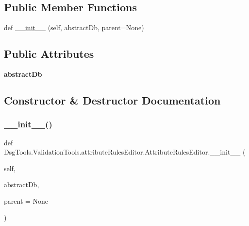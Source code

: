 \subsection*{Public Member Functions}
\begin{DoxyCompactItemize}
\item 
def \mbox{\hyperlink{class_dsg_tools_1_1_validation_tools_1_1attribute_rules_editor_1_1_attribute_rules_editor_a6d02f1461b839b8b83d65214df579569}{\+\_\+\+\_\+init\+\_\+\+\_\+}} (self, abstract\+Db, parent=None)
\end{DoxyCompactItemize}
\subsection*{Public Attributes}
\begin{DoxyCompactItemize}
\item 
\mbox{\label{class_dsg_tools_1_1_validation_tools_1_1attribute_rules_editor_1_1_attribute_rules_editor_a4102cf2d5f1e05633e457c342df95482}} 
{\bfseries abstract\+Db}
\end{DoxyCompactItemize}


\subsection{Constructor \& Destructor Documentation}
\mbox{\label{class_dsg_tools_1_1_validation_tools_1_1attribute_rules_editor_1_1_attribute_rules_editor_a6d02f1461b839b8b83d65214df579569}} 
\subsubsection{\texorpdfstring{\+\_\+\+\_\+init\+\_\+\+\_\+()}{\_\_init\_\_()}}
{\footnotesize\ttfamily def Dsg\+Tools.\+Validation\+Tools.\+attribute\+Rules\+Editor.\+Attribute\+Rules\+Editor.\+\_\+\+\_\+init\+\_\+\+\_\+ (\begin{DoxyParamCaption}\item[{}]{self,  }\item[{}]{abstract\+Db,  }\item[{}]{parent = {\ttfamily None} }\end{DoxyParamCaption})}

